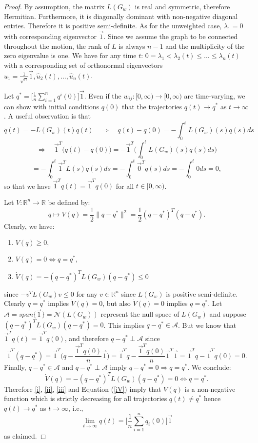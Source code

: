\documentclass{aims}
\theoremstyle{definition}
\begin{document}
\begin{proof}
By assumption, the matrix $L(G_w)$ is real and symmetric, therefore Hermitian.
Furthermore, it is diagonally dominant with non-negative diagonal entries.
Therefore it is positive semi-definite. As for the unweighted case, 
$\lambda_1=0$ with corresponding eigenvector $\vec{1}$. Since we assume the graph to be connected throughout the motion, the rank of $L$ is always $n-1$ and the multiplicity of the zero eigenvalue is one. We have for any time $t$:  $0=\lambda_1<\lambda_2(t)\leq\dots\leq\lambda_n(t)$
with a corresponding set of orthonormal
eigenvectors $\hat{u}_1=\frac{1}{\sqrt{n}}\vec{1},\hat{u}_2(t),\dots,\hat{u}_n(t)$.

Let $q^*=\bigg[\frac{1}{n}\sum_{i=1}^nq^i(0)\bigg]\vec{1}$.
Even if the $w_{ij}:[0,\infty)\to[0,\infty)$ are time-varying,
we can show with initial conditions $q(0)$ that the trajectories $q(t)\to q^*$ as $t\to\infty$.
A useful observation is that
$$\dot{q}(t)=-L(G_w)(t)q(t)\quad\Rightarrow\quad q(t)-q(0)=-\int_{0}^{t}L(G_w)(s)q(s)ds$$
$$\Rightarrow\quad\vec{1}^T\big(q(t)-q(0)\big)=-\vec{1}^T\bigg(\int_{0}^{t}L(G_w)(s)q(s)ds\bigg)$$
$$=-\int_{0}^{t}\vec{1}^TL(s)q(s)ds=-\int_{0}^{t}\vec{0}^Tq(s)ds=-\int_{0}^{t}0ds=0,$$
so that we have $\vec{1}^Tq(t)=\vec{1}^Tq(0)$ for all $t\in[0,\infty)$.

Let $V:\mathbb{R}^n\to\mathbb{R}$ be defined by:
$$q\mapsto V(q)=\frac{1}{2}\|q-q^*\|^2=\frac{1}{2}(q-q^*)^T(q-q^*).$$
Clearly, we have:
\begin{enumerate}
    \item $V(q)\geq 0$\label{i},
    \item $V(q)=0\iff q=q^*$\label{ii},
    \item $\dot{V}(q)=-(q-q^*)^TL(G_w)(q-q^*)\leq 0$\label{iii}
\end{enumerate}
since $-v^TL(G_w)v\leq 0$ for any $v\in\mathbb{R}^n$ since $L(G_w)$ is positive semi-definite.
Clearly $q=q^*$ implies $\dot{V}(q)=0$, but also $\dot{V}(q)=0$ implies $q=q^*$.
Let $\mathcal{A}=span\{\vec{1}\}=\mathcal{N}(L(G_w))$ represent the null space
of $L(G_w)$ and suppose $(q-q^*)^TL(G_w)(q-q^*)=0$.
This implies $q-q^*\in\mathcal{A}$.
But we know that $\vec{1}^Tq(t)=\vec{1}^Tq(0)$, and therefore $q-q^*\perp\mathcal{A}$ since
\begin{equation}
\vec{1}^T(q-q^*)=\vec{1}^T\big(q-\frac{\vec{1}^Tq(0)}{n}\vec{1}\big)=\vec{1}^Tq-\frac{\vec{1}^Tq(0)}{n}\vec{1}^T\vec{1}=\vec{1}^Tq-\vec{1}^Tq(0)=0.
\end{equation}
Finally, $q-q^*\in\mathcal{A}$ and $q-q^*\perp\mathcal{A}$ imply $q-q^*=0\Rightarrow q=q^*$. We conclude:
\begin{equation}
\label{iV}
    \dot{V}(q)=-(q-q^*)^TL(G_w)(q-q^*)=0\iff q=q^*.
\end{equation}
Therefore \ref{i}, \ref{ii}, \ref{iii} and Equation (\ref{iV}) imply that $V(q)$ is a non-negative function which is strictly decreasing for all trajectories $q(t)\neq q^*$
hence $q(t)\to q^*$ as $t\to\infty$, i.e.,
$$\lim_{t\rightarrow\infty}q(t)=\bigg[\frac{1}{n}\sum_{i=1}^nq_i(0)\bigg]\vec{1}$$
as claimed.

\end{proof}
\end{document}

